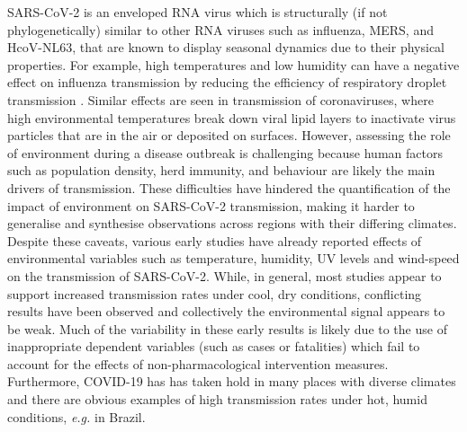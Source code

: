 \documentclass[12pt,english,a4paper]{article}
\newcommand{\virus}{SARS-CoV-2\xspace}
\newcommand{\disease}{COVID-19\xspace}
\begin{document}
\virus is an enveloped RNA virus which is structurally (if not phylogenetically)
similar to other RNA viruses such as influenza, MERS, and HcoV-NL63\cite{Xie2020}, that are known to display seasonal dynamics due to their physical properties. For example, high temperatures and low humidity can have a negative effect on influenza transmission by reducing the efficiency of respiratory droplet transmission \cite{Lowen2007, Lowen2014}. Similar effects are seen in transmission of coronaviruses\cite{Tan2005, Chan2011, VanDoremalen2013}, where high environmental temperatures break down viral lipid layers to inactivate virus particles that are in the air or deposited on surfaces\cite{Chan2011,Schoeman2019}.
However, assessing the role of environment during a disease outbreak is challenging\cite{Carlson2020} because human factors such as population density, herd immunity, and behaviour are likely the main drivers of transmission\cite{Korevaar2020, Rocklov2020}. 
These difficulties have hindered the quantification of the impact of environment on \virus transmission, making it harder to generalise and synthesise observations across regions with their differing climates.
Despite these caveats, various early studies have already reported effects of environmental variables such as temperature, humidity, UV levels and wind-speed on the transmission of \virus \cite{Araujo2020, Baker2020, Bukhari2020, Chen2020, Luo2020, Ma2020, Merow2020, Sajadi2020}.
While, in general, most studies appear to support increased transmission rates under cool, dry conditions\cite{Baker2020},
conflicting results have been observed\cite{Luo2020, Yao2020} and collectively the environmental signal appears to be weak\cite{Smit2020}. 
Much of the variability in these early results is likely due to the use of inappropriate dependent variables (such as cases or fatalities) which fail to account for the effects of non-pharmacological intervention measures\cite{Smit2020}. Furthermore, \disease has has taken hold in many places with diverse climates and there are obvious examples of high transmission rates under hot, humid conditions, \emph{e.g.} in Brazil\cite{Candido2020}.
\end{document}
